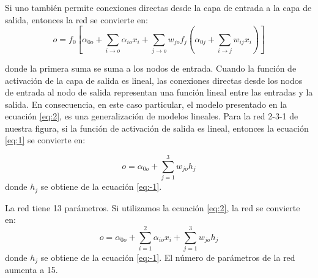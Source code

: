 	Si uno tambi\'en permite conexiones directas desde la capa de entrada a la capa de salida, entonces la red se convierte en:
	\begin{equation}  \label{eq:2}
	o = f_0 \left[ \alpha_{0o} + \sum_{i \to o} \alpha_{io} x_i + \sum_{j \to o} w_{jo} f_j \left( \alpha_{0j} + \sum_{i \to j} w_{ij} x_i \right) \right]
	\end{equation}
	
	donde la primera suma se suma a los nodos de entrada. Cuando la funci\'on de activaci\'on de la capa de salida es lineal, las conexiones directas desde los nodos de entrada al nodo de salida representan una funci\'on lineal entre las entradas y la salida. En consecuencia, en este caso particular, el modelo presentado en la ecuaci\'on \ref{eq:2}, es una generalizaci\'on de modelos lineales. Para la red 2-3-1 de nuestra figura, si la funci\'on de activaci\'on de salida es lineal, entonces la ecuaci\'on \ref{eq:1} se convierte en:
	
	\begin{equation*} 
	o =  \alpha_{0o} + \sum_{j=1}^ {3} w_{jo} h_j 
	\end{equation*}
	donde $h_j$ se obtiene de la ecuaci\'on \ref{eq:-1}.
	
	La red tiene 13 par\'ametros. Si utilizamos la ecuaci\'on \ref{eq:2},  la red se convierte en:
	\begin{equation*} 
	o =  \alpha_{0o} + \sum_{i=1}^ {2}  \alpha_{io} x_i  + \sum_{j=1}^ {3} w_{jo} h_j 
	\end{equation*}
	donde $h_j$ se obtiene de la ecuaci\'on \ref{eq:-1}. El n\'umero de par\'ametros de la red aumenta a 15.
	
